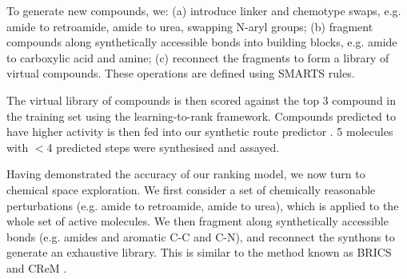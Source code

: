 

To generate new compounds, we: (a) introduce linker and chemotype swaps, e.g. amide to retroamide, amide to urea, swapping N-aryl groups; (b) fragment compounds along synthetically accessible bonds into building blocks, e.g. amide to carboxylic acid and amine; (c) reconnect the fragments to form a library of virtual compounds. These operations are defined using SMARTS rules. 

The virtual library of compounds is then scored against the top 3 compound in the training set using the learning-to-rank framework. Compounds predicted to have higher activity is then fed into our synthetic route predictor \cite{schwaller2019molecular,yang2019molecular}. 5 molecules with $<$4 predicted steps were synthesised and assayed. 


Having demonstrated the accuracy of our ranking model, we now turn to chemical space exploration. We first consider a set of chemically reasonable perturbations (e.g. amide to retroamide, amide to urea), which is applied to the whole set of active molecules. We then fragment along synthetically accessible bonds (e.g. amides and aromatic C-C and C-N), and reconnect the synthons to generate an exhaustive library. This is similar to the method known as BRICS \cite{Degen2008brics} and CReM \cite{Polishchuk2020Crem}.

